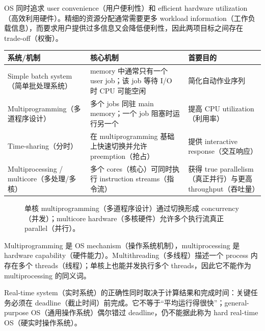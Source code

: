 OS 同时追求 user convenience（用户便利性）和 efficient hardware utilization（高效利用硬件）。精细的资源分配通常需要更多 workload information（工作负载信息），而要求用户提供过多信息又会降低便利性，因此两项目标之间存在 trade-off（权衡）。


\begin{center}
\small
\begin{tabularx}{\textwidth}{@{}>{\raggedright\arraybackslash}p{3.0cm}>{\raggedright\arraybackslash}p{4.4cm}X@{}}
  \toprule
  系统/机制 & 核心机制 & 首要目的 \\
  \midrule
  Simple batch system（简单批处理系统） & memory 中通常只有一个 user job；该 job 等待 I/O 时 CPU 可能空闲 & 简化自动作业序列 \\
  Multiprogramming（多道程序设计） & 多个 jobs 同驻 main memory；一个 job 阻塞时运行另一个 & 提高 CPU utilization（利用率） \\
  Time-sharing（分时） & 在 multiprogramming 基础上快速切换并允许 preemption（抢占） & 提供 interactive response（交互响应） \\
  Multiprocessing / multicore（多处理/多核） & 多个 cores（核心）可同时执行 instruction streams（指令流） & 获得 true parallelism（真正并行）与更高 throughput（吞吐量） \\
  \bottomrule
\end{tabularx}
\end{center}

\begin{figure}[htbp]
  \centering
  \resizebox{0.96\textwidth}{!}{}
  \caption{单核 multiprogramming（多道程序设计）通过切换形成 concurrency（并发）；multicore hardware（多核硬件）允许多个执行流真正 parallel（并行）。}
  \label{fig:sc2005-l02-concurrency-parallelism}
\end{figure}

Multiprogramming 是 OS mechanism（操作系统机制），multiprocessing 是 hardware capability（硬件能力）。Multithreading（多线程）描述一个 process 内存在多个 threads（线程）；单核上也能并发执行多个 threads，因此它不能作为 multiprocessing 的同义词。

Real-time system（实时系统）的正确性同时取决于计算结果和完成时间：关键任务必须在 deadline（截止时间）前完成。它不等于“平均运行得很快”；general-purpose OS（通用操作系统）偶尔错过 deadline，仍不能据此称为 hard real-time OS（硬实时操作系统）。

